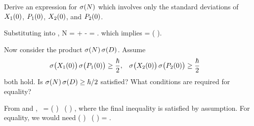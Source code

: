 \begin{problem}
	Derive an expression for $\sigma(N)$ which involves only the standard deviations of $X_1(0)$, $P_1(0)$, $X_2(0)$, and $P_2(0)$.
\end{problem}

\begin{solution}
	Substituting  into ,
	\beq
		N = \Xwo +  \Xqo - \Xqo = \Xwo.
	\eeq
	which implies
	\beqn \label{sigN}
		\sigN = \sigma\big( \Xwo \big).
	\eeqn
\end{solution}

\begin{problem}
	Now consider the product $\sigma(N) \, \sigma(D)$.  Assume
	\begin{align*}
		\sigma\big( X_1(0) \big) \, \sigma\big( P_1(0) \big) &\geq \frac{\hbar}{2}, &
		\sigma\big( X_2(0) \big) \, \sigma\big( P_2(0) \big) &\geq \frac{\hbar}{2}
	\end{align*}
	both hold.  Is $\sigma(N) \, \sigma(D) \geq \hbar / 2$ satisfied?  What conditions are required for equality?
\end{problem}

\begin{solution}
	From  and ,
	\beq
		\sigN \, \sigD = \sigma\big( \Pwo \big) \, \sigma\big( \Xwo \big) \geq {},
	\eeq
	where the final inequality is satisfied by assumption.  For equality, we would need
	\beq
		\sigma\big( \Xwo \big) \, \sigma\big( \Pwo \big) = .
	\eeq
	
\end{solution}